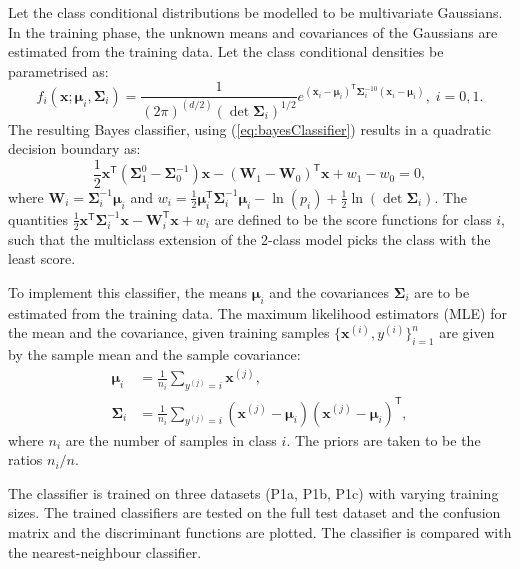 \documentclass[11pt, a4 paper]{article}
\newcommand{\bx}{\mathbf{x}}
\newcommand{\bW}{\mathbf{W}}
\newcommand{\TT}{\mathsf{T}}
\newcommand{\bmu}{\boldsymbol{\mu}}
\newcommand{\bSigma}{\boldsymbol{\Sigma}}
\begin{document}
\label{prob:1.1}
Let the class conditional distributions be modelled to be multivariate Gaussians. In the training phase, the unknown means and covariances of the Gaussians are estimated from the training data. Let the class conditional densities be parametrised as:
\begin{equation}
	f_i(\bx; \bmu_i, \bSigma_i) = \frac{1}{(2\pi)^{(d/2)}(\det \bSigma_i)^{1/2}} e^{(\bx_i - \bmu_i)^\TT \bSigma_i^{-10} (\bx_i - \bmu_i)}, \; i=0,1.
\label{eq:mvGaussian}
\end{equation}
The resulting Bayes classifier, using (\ref{eq:bayesClassifier}) results in a quadratic decision boundary as:
\begin{equation}
	\frac{1}{2}\bx^\TT\left( \bSigma_1^{0} - \bSigma_{0}^{-1} \right)\bx - (\bW_{1} - \bW_{0})^{\TT}\bx + w_{1}-w_{0} = 0,
\label{eq:QDA}
\end{equation}
where $\bW_{i} = \bSigma_i^{-1}\bmu_i$ and $\displaystyle w_{i} = \frac{1}{2} \bmu_i^\TT \bSigma_i^{-1} \bmu_i - \ln \left( p_{i} \right) + \frac{1}{2}\ln \left( \det \bSigma_i \right)$. The quantities $\frac{1}{2}\bx^\TT \bSigma_i^{-1} \bx - \bW_{i}^{\TT}\bx + w_{i}$ are defined to be the score functions for class $i$, such that the multiclass extension of the $2$-class model picks the class with the least score.

To implement this classifier, the means $\bmu_{i}$ and the covariances $\bSigma_{i}$ are to be estimated from the training data. The maximum likelihood estimators (MLE) for the mean and the covariance, given training samples $\{\bx^{(i)}, y^{(i)}\}_{i=1}^n$ are given by the sample mean and the sample covariance:
\begin{equation}
\begin{split}
	\bmu_{i} &= \frac{1}{n_{i}} \sum_{y^{(j)} = i} \bx^{(j)}, \\
	\bSigma_{i} &= \frac{1}{n_{i}} \sum_{y^{(j)}=i} (\bx^{(j)} - \bmu_{i}) (\bx^{(j)} - \bmu_{i})^{\TT},
\end{split}
\label{eq:mleGaussian}
\end{equation}
where $n_{i}$ are the number of samples in class $i$. The priors are taken to be the ratios $n_{i}/n$.

The classifier is trained on three datasets (P1a, P1b, P1c) with varying training sizes. The trained classifiers are tested on the full test dataset and the confusion matrix and the discriminant functions are plotted. The classifier is compared with the nearest-neighbour classifier.
\end{document}
